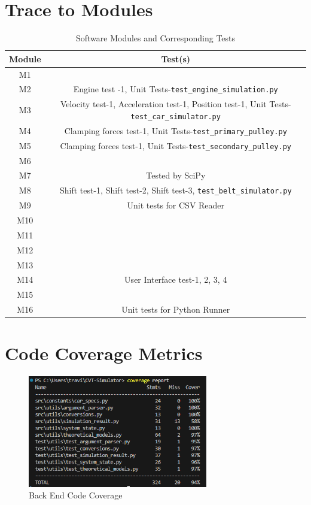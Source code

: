 \documentclass[12pt, titlepage]{article}
\begin{document}
\section{Trace to Modules}	

\begin{table}[H]
  \centering
    \begin{tabular}{|c|c|}
      \hline
      \textbf{Module} & \textbf{Test(s)} \\ \hline
      M1 & \\ \hline
      M2 & Engine test -1, Unit Tests-\texttt{test\_engine\_simulation.py} \\ \hline
      M3 & Velocity test-1, Acceleration test-1, Position test-1, Unit Tests-\texttt{test\_car\_simulator.py} \\ \hline
      M4 & Clamping forces test-1, Unit Tests-\texttt{test\_primary\_pulley.py} \\ \hline
      M5 & Clamping forces test-1, Unit Tests-\texttt{test\_secondary\_pulley.py} \\ \hline
      M6 &  \\ \hline
      M7 & Tested by SciPy \\ \hline
      M8 & Shift test-1, Shift test-2, Shift test-3, \texttt{test\_belt\_simulator.py}  \\ \hline
      M9 & Unit tests for CSV Reader \\ \hline
      M10 &  \\ \hline
      M11 &  \\ \hline
      M12 &  \\ \hline
      M13 &  \\ \hline
      M14 & User Interface test-1, 2, 3, 4 \\ \hline
      M15 &  \\ \hline
      M16 &  Unit tests for Python Runner\\ \hline
      \end{tabular}
      \caption{Software Modules and Corresponding Tests}
      \label{tab:modules_tests}
  \end{table}

\section{Code Coverage Metrics}

\begin{figure}[H]
  \begin{center}
   \includegraphics[width=0.7\textwidth]{UnitTestCoverageReport.png}
  \caption{Back End Code Coverage}
  \label{Fig_Home} 
  \end{center}
\end{figure}
\end{document}
